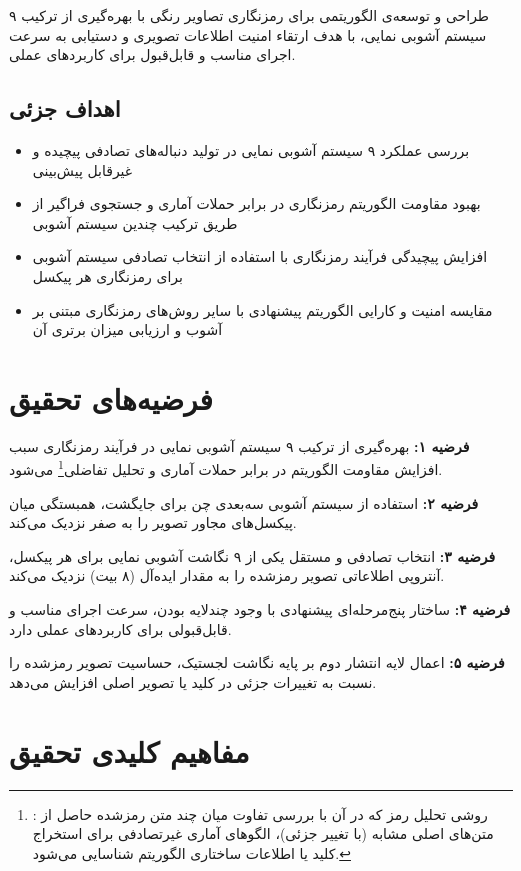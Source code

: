 طراحی و توسعه‌ی الگوریتمی برای رمزنگاری تصاویر رنگی با بهره‌گیری از ترکیب ۹ سیستم آشوبی نمایی، با هدف ارتقاء امنیت اطلاعات تصویری و دستیابی به سرعت اجرای مناسب و قابل‌قبول برای کاربردهای عملی.

\subsection{اهداف جزئی}

\begin{itemize}
    \item بررسی عملکرد ۹ سیستم آشوبی نمایی در تولید دنباله‌های تصادفی پیچیده و غیرقابل پیش‌بینی
    \item بهبود مقاومت الگوریتم رمزنگاری در برابر حملات آماری و جستجوی فراگیر از طریق ترکیب چندین سیستم آشوبی
    \item افزایش پیچیدگی فرآیند رمزنگاری با استفاده از انتخاب تصادفی سیستم آشوبی برای رمزنگاری هر پیکسل
    \item مقایسه امنیت و کارایی الگوریتم پیشنهادی با سایر روش‌های رمزنگاری مبتنی بر آشوب و ارزیابی میزان برتری آن
\end{itemize}

\section{فرضیه‌های تحقیق}

\textbf{فرضیه ۱:} بهره‌گیری از ترکیب ۹ سیستم آشوبی نمایی در فرآیند رمزنگاری سبب افزایش مقاومت الگوریتم در برابر حملات آماری و تحلیل تفاضلی\footnote{: روشی تحلیل رمز که در آن با بررسی تفاوت میان چند متن رمزشده حاصل از متن‌های اصلی مشابه (با تغییر جزئی)، الگوهای آماری غیرتصادفی برای استخراج کلید یا اطلاعات ساختاری الگوریتم شناسایی می‌شود.} می‌شود.

\textbf{فرضیه ۲:} استفاده از سیستم آشوبی سه‌بعدی چن برای جایگشت، همبستگی میان پیکسل‌های مجاور تصویر را به صفر نزدیک می‌کند.

\textbf{فرضیه ۳:} انتخاب تصادفی و مستقل یکی از ۹ نگاشت آشوبی نمایی برای هر پیکسل، آنتروپی اطلاعاتی تصویر رمزشده را به مقدار ایده‌آل (۸ بیت) نزدیک می‌کند.

\textbf{فرضیه ۴:} ساختار پنج‌مرحله‌ای پیشنهادی با وجود چندلایه بودن، سرعت اجرای مناسب و قابل‌قبولی برای کاربردهای عملی دارد.

\textbf{فرضیه ۵:} اعمال لایه انتشار دوم بر پایه نگاشت لجستیک، حساسیت تصویر رمزشده را نسبت به تغییرات جزئی در کلید یا تصویر اصلی افزایش می‌دهد.

\section{مفاهیم کلیدی تحقیق}

